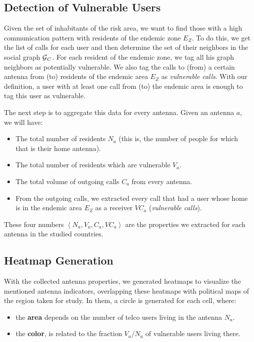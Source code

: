 \subsection{Detection of Vulnerable Users}\label{subsection:vulnerable_users_detection}

Given the set of inhabitants of the risk area, we want to find those with a high communication pattern with residents of the endemic zone $E_Z$. To do this, we get the list of calls for each user and then determine the set of their neighbors in the social graph $\operatorname{\mathcal{G}}_C$. For each resident of the endemic zone, we tag all his graph neighbors as potentially vulnerable. We also tag the calls to (from) a certain antenna from (to) residents of the endemic area $E_Z$ as \textit{vulnerable calls}. With our definition, a user with at least one call from (to) the endemic area is enough to tag this user as vulnerable.

The next step is to aggregate this data for every antenna. Given an antenna $a$, we will have:
\begin{itemize}
	\item The total number of residents $N_a$ (this is, the number of people for which that is their home antenna).
	\item The total number of residents which are vulnerable $V_a$.
	\item The total volume of outgoing calls $C_a$ from every antenna.
	\item From the outgoing calls, we extracted every call that had a user whose home is in the endemic area $E_Z$ as a receiver $VC_a$ (\textit{vulnerable calls}).
\end{itemize}

These four numbers $\left< N_a, V_a, C_a, VC_a \right>$ are the properties we extracted for each antenna in the studied countries.


\subsection{Heatmap Generation}
With the collected antenna properties, we generated heatmaps to visualize the mentioned antenna indicators, overlapping these heatmaps with political maps of the region taken for study.
In them, a circle is generated for each cell, where:
\begin{itemize}
	\item the \textbf{area} depends on the number of telco users living in the antenna $N_a$.
	\item the \textbf{color}, is related to the fraction ${V_a}/{N_a}$ of vulnerable users living there.
\end{itemize}


